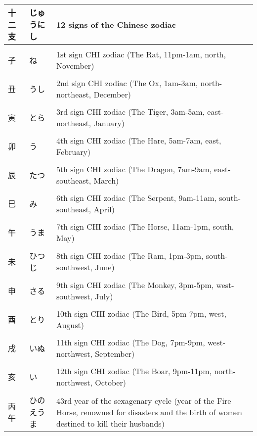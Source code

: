 \documentclass{article}
\begin{document}
\begin{tabular}{ l | l | p{10.5cm} }
十二支	&じゅうにし 			&12 signs of the Chinese zodiac \\ \hline \\[-1em]
子		&ね				&1st sign CHI zodiac (The Rat, 11pm-1am, north, November) \\ \hline \\[-1em]
丑		&うし				&2nd sign CHI zodiac (The Ox, 1am-3am, north-northeast, December) \\ \hline \\[-1em]
寅		&とら				&3rd sign CHI zodiac (The Tiger, 3am-5am, east-northeast, January) \\ \hline \\[-1em]
卯		&う				&4th sign CHI zodiac (The Hare, 5am-7am, east, February) \\ \hline \\[-1em]
辰		&たつ				&5th sign CHI zodiac (The Dragon, 7am-9am, east-southeast, March) \\ \hline \\[-1em]
巳		&み				&6th sign CHI zodiac (The Serpent, 9am-11am, south-southeast, April) \\ \hline \\[-1em]
午		&うま				&7th sign CHI zodiac (The Horse, 11am-1pm, south, May) \\ \hline \\[-1em]
未		&ひつじ			&8th sign CHI zodiac (The Ram, 1pm-3pm, south-southwest, June) \\ \hline \\[-1em]
申		&さる				&9th sign CHI zodiac (The Monkey, 3pm-5pm, west-southwest, July) \\ \hline \\[-1em]
酉		&とり				&10th sign CHI zodiac (The Bird, 5pm-7pm, west, August) \\ \hline \\[-1em]
戌		&いぬ				&11th sign CHI zodiac (The Dog, 7pm-9pm, west-northwest, September) \\ \hline \\[-1em]
亥		&い				&12th sign CHI zodiac (The Boar, 9pm-11pm, north-northwest, October) \\ \hline \\[-1em]
丙午		&ひのえうま			&43rd year of the sexagenary cycle (year of the Fire Horse, 
							renowned for disasters and the birth of women destined to kill their husbands) \\[-1em] 
\end{tabular}
\end{document}

